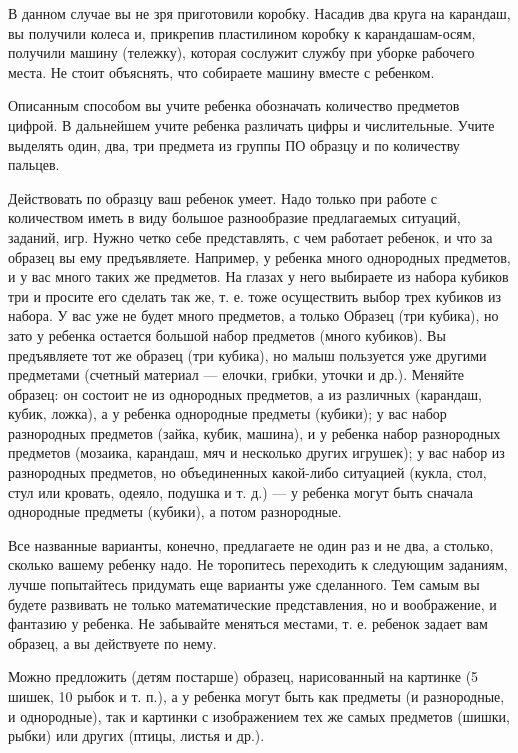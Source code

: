 \documentclass{book}
\begin{document}
В данном случае вы не зря приготовили коробку. Насадив два круга на
карандаш, вы получили колеса и, прикрепив пластилином коробку к
карандашам-осям, получили машину (тележку), которая сослужит службу при
уборке рабочего места. Не стоит объяснять, что собираете машину вместе с
ребенком.

Описанным способом вы учите ребенка обозначать количество предметов
цифрой. В дальнейшем учите ребенка различать цифры и числительные. Учите
выделять один, два, три предмета из группы ПО образцу и по количеству
пальцев.

Действовать по образцу ваш ребенок умеет. Надо только при работе с
количеством иметь в виду большое разнообразие предлагаемых ситуаций,
заданий, игр. Нужно четко себе представлять, с чем работает ребенок, и
что за образец вы ему предъявляете. Например, у ребенка много однородных
предметов, и у вас много таких же предметов. На глазах у него выбираете
из набора кубиков три и просите его сделать так же, т. е. тоже
осуществить выбор трех кубиков из набора. У вас уже не будет много
предметов, а только Образец (три кубика), но зато у ребенка остается
большой набор предметов (много кубиков). Вы предъявляете тот же образец
(три кубика), но малыш пользуется уже другими предметами (счетный
материал --- елочки, грибки, уточки и др.). Меняйте образец: он состоит
не из однородных предметов, а из различных (карандаш, кубик, ложка), а у
ребенка однородные предметы (кубики); у вас набор разнородных предметов
(зайка, кубик, машина), и у ребенка набор разнородных предметов
(мозаика, карандаш, мяч и несколько других игрушек); у вас набор из
разнородных предметов, но объединенных какой-либо ситуацией (кукла,
стол, стул или кровать, одеяло, подушка и т. д.) --- у ребенка могут
быть сначала однородные предметы (кубики), а потом разнородные.

Все названные варианты, конечно, предлагаете не один раз и не два, а
столько, сколько вашему ребенку надо. Не торопитесь переходить к
следующим заданиям, лучше попытайтесь придумать еще варианты уже
сделанного. Тем самым вы будете развивать не только математические
представления, но и воображение, и фантазию у ребенка. Не забывайте
меняться местами, т. е. ребенок задает вам образец, а вы действуете по
нему.

Можно предложить (детям постарше) образец, нарисованный на картинке (5
шишек, 10 рыбок и т. п.), а у ребенка могут быть как предметы (и
разнородные, и однородные), так и картинки с изображением тех же самых
предметов (шишки, рыбки) или других (птицы, листья и др.).
\end{document}
